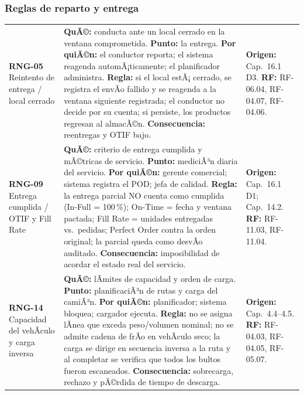 \subsubsection{Reglas de reparto y entrega}

\begin{table}[htbp]
\centering
\small
\begin{tabularx}{\textwidth}{@{}L{2.4cm}L{8.3cm}L{4.2cm}@{}}
\toprule
\textbf{RNG-05} \textbar{} Reintento de entrega / local cerrado &
\textbf{QuÃ©:} conducta ante un local cerrado en la ventana comprometida. \textbf{Punto:}
la entrega. \textbf{Por quiÃ©n:} el conductor reporta; el sistema reagenda
automÃ¡ticamente; el planificador administra. \textbf{Regla:} si el local estÃ¡ cerrado, se
registra el envÃ­o fallido y se reagenda a la ventana siguiente registrada; el conductor
no decide por su cuenta; si persiste, los productos regresan al almacÃ©n.
\textbf{Consecuencia:} reentregas y OTIF bajo. &
\textbf{Origen:} Cap.\ 16.1 D3. \textbf{RF:} RF-06.04, RF-04.07, RF-04.06. \\
\addlinespace
\textbf{RNG-09} \textbar{} Entrega cumplida / OTIF y Fill Rate &
\textbf{QuÃ©:} criterio de entrega cumplida y mÃ©tricas de servicio. \textbf{Punto:}
mediciÃ³n diaria del servicio. \textbf{Por quiÃ©n:} gerente comercial; sistema registra el
POD; jefa de calidad. \textbf{Regla:} la entrega parcial NO cuenta como cumplida (In-Full
= 100\,\%); On-Time = fecha y ventana pactada; Fill Rate = unidades entregadas vs.\
pedidas; Perfect Order contra la orden original; la parcial queda como desvÃ­o auditado.
\textbf{Consecuencia:} imposibilidad de acordar el estado real del servicio. &
\textbf{Origen:} Cap.\ 16.1 D1; Cap.\ 14.2. \textbf{RF:} RF-11.03, RF-11.04. \\
\addlinespace
\textbf{RNG-14} \textbar{} Capacidad del vehÃ­culo y carga inversa &
\textbf{QuÃ©:} lÃ­mites de capacidad y orden de carga. \textbf{Punto:} planificaciÃ³n de
rutas y carga del camiÃ³n. \textbf{Por quiÃ©n:} planificador; sistema bloquea; cargador
ejecuta. \textbf{Regla:} no se asigna lÃ­nea que exceda peso/volumen nominal; no se admite
cadena de frÃ­o en vehÃ­culo seco; la carga se dirige en secuencia inversa a la ruta y al
completar se verifica que todos los bultos fueron escaneados. \textbf{Consecuencia:}
sobrecarga, rechazo y pÃ©rdida de tiempo de descarga. &
\textbf{Origen:} Cap.\ 4.4--4.5. \textbf{RF:} RF-04.03, RF-04.05, RF-05.07. \\
\bottomrule
\end{tabularx}
\end{table}

